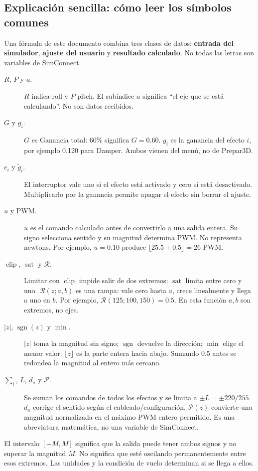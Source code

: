 \documentclass[11pt,a4paper]{article}
\newcommand{\sat}{\operatorname{sat}}
\newcommand{\clip}{\operatorname{clip}}
\newcommand{\sgn}{\operatorname{sgn}}
\begin{document}
\subsection{Explicación sencilla: cómo leer los símbolos comunes}
Una fórmula de este documento combina tres clases de datos: \textbf{entrada del simulador}, \textbf{ajuste del usuario} y \textbf{resultado calculado}. No todas las letras son variables de SimConnect.
\begin{description}
\item[$R$, $P$ y $a$.] $R$ indica roll y $P$ pitch. El subíndice $a$ significa ``el eje que se está calculando''. No son datos recibidos.
\item[$G$ y $g_i$.] $G$ es Ganancia total: 60\% significa $G=0.60$. $g_i$ es la ganancia del efecto $i$, por ejemplo 0.120 para Damper. Ambos vienen del menú, no de Prepar3D.
\item[$e_i$ y $\widetilde g_i$.] El interruptor vale uno si el efecto está activado y cero si está desactivado. Multiplicarlo por la ganancia permite apagar el efecto sin borrar el ajuste.
\item[$u$ y PWM.] $u$ es el comando calculado antes de convertirlo a una salida entera. Su signo selecciona sentido y su magnitud determina PWM. No representa newtons. Por ejemplo, $u=0.10$ produce $\lfloor25.5+0.5\rfloor=26$ PWM.
\item[$\clip$, $\sat$ y $\mathcal R$.] Limitar con $\clip$ impide salir de dos extremos; $\sat$ limita entre cero y uno. $\mathcal R(z;a,b)$ es una rampa: vale cero hasta $a$, crece linealmente y llega a uno en $b$. Por ejemplo, $\mathcal R(125;100,150)=0.5$. En esta función $a,b$ son extremos, no ejes.
\item[$|z|$, $\sgn(z)$ y $\min$.] $|z|$ toma la magnitud sin signo; $\sgn$ devuelve la dirección; $\min$ elige el menor valor. $\lfloor z\rfloor$ es la parte entera hacia abajo. Sumando 0.5 antes se redondea la magnitud al entero más cercano.
\item[$\sum_i$, $L$, $d_a$ y $\mathcal P$.] Se suman los comandos de todos los efectos y se limita a $\pm L=\pm220/255$. $d_a$ corrige el sentido según el cableado/configuración. $\mathcal P(z)$ convierte una magnitud normalizada en el máximo PWM entero permitido. Es una abreviatura matemática, no una variable de SimConnect.
\end{description}
El intervalo $[-M,M]$ significa que la salida puede tener ambos signos y no superar la magnitud $M$. No significa que esté oscilando permanentemente entre esos extremos. Las unidades y la condición de vuelo determinan si se llega a ellos.
\end{document}
